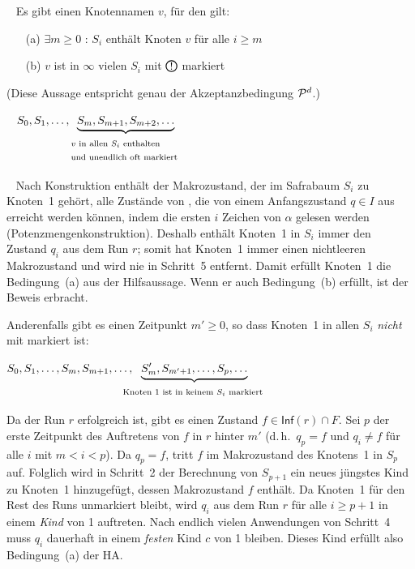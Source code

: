 \documentclass[fontsize=11pt, twoside=false, numbers=autoenddot]{scrbook}
\begin{document}
~
Es gibt einen Knotennamen $v$, für den gilt:
\begin{itemize}
  \item[(a)]
    $\exists m \geqslant 0$ : 
    $S_i$ enthält Knoten $v$ für alle $i \geqslant m$
  \item[(b)]
    $v$ ist in $\infty$ vielen $S_i$ mit $\circled{!}$ markiert
\end{itemize}

\par\medskip\noindent
(Diese Aussage entspricht genau der Akzeptanzbedingung $\mathcal{P}^d$.)

\par\medskip\noindent
{}~
$S_0,S_1,\dots,\underbrace{S_m,S_{m+1},S_{m+2},\dots}_{%
  \text{%
    \begin{tabular}{@{}l@{}}
      $v$ in allen $S_i$ enthalten \\
      und unendlich oft markiert
    \end{tabular}
  }
}$

\par\medskip\noindent
{}~
Nach Konstruktion enthält der Makrozustand, der im Safrabaum $S_i$ zu Knoten~1 gehört,
alle Zustände von \Amc, die von einem Anfangszustand $q \in I$ aus erreicht werden können,
indem die ersten $i$ Zeichen von $\alpha$ gelesen werden (Potenzmengen\-konstruktion).
Deshalb enthält Knoten~1 in $S_i$ immer den Zustand $q_i$ aus dem Run $r$;
somit hat Knoten~1 immer einen nichtleeren Makrozustand
und wird nie in Schritt~5 entfernt.
Damit erfüllt Knoten~1 die Bedingung~(a) aus der Hilfsaussage.
Wenn er auch Bedingung~(b) erfüllt, ist der Beweis erbracht.

Anderenfalls gibt es einen Zeitpunkt $m' \geq 0$, %
so dass Knoten~1 in allen $S_i$ \emph{nicht} mit \circled{!} markiert ist:
%
\begin{center}
  $S_0,S_1,\dots,S_m,S_{m+1},\dots,\!\!\!\!\!\!\underbrace{S_m',S_{m'+1},\dots,S_p,\dots}_{%
    \text{%
      \begin{tabular}{@{}l@{}}
        Knoten 1 ist in keinem $S_i$ markiert %
      \end{tabular}
    }
  }$
\end{center}
%
Da der Run $r$ erfolgreich ist, gibt es einen Zustand $f \in \textsf{Inf}(r) \cap F$.
Sei $p$ der erste Zeitpunkt des Auftretens von $f$ in $r$ hinter $m'$
(d.\,h.\ $q_p = f$ und $q_i \neq f$ für alle $i$ mit $m < i < p$).
Da $q_p = f$, tritt $f$ im Makrozustand des Knotens~1 in $S_p$ auf.
Folglich wird in Schritt~2 der Berechnung von $S_{p+1}$ ein neues jüngstes Kind
zu Knoten~1 hinzugefügt, dessen Makrozustand $f$ enthält.
Da Knoten~1 für den Rest des Runs unmarkiert bleibt,
wird $q_i$ aus dem Run $r$ für alle $i \geq p+1$ in einem \emph{Kind} von 1 auftreten.
Nach endlich vielen Anwendungen von Schritt~4 muss $q_i$ dauerhaft
in einem \emph{festen} Kind $c$ von 1 bleiben.
Dieses Kind erfüllt also Bedingung~(a) der HA.
\end{document}
